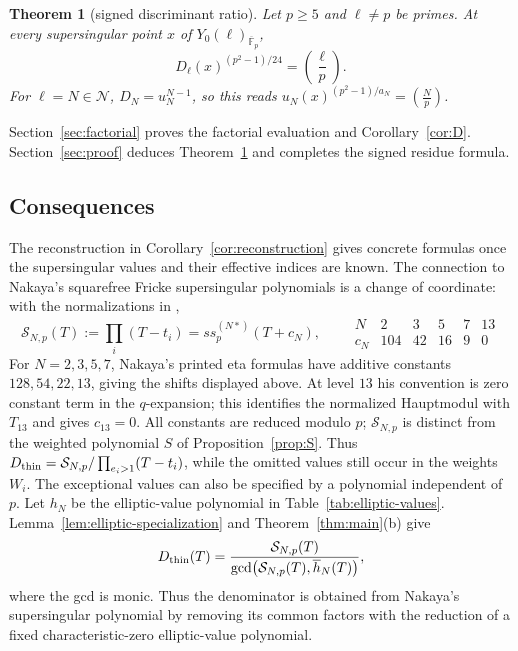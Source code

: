 \documentclass[11pt,a4paper]{article}
\numberwithin{equation}{section}
\newtheorem{theorem}{Theorem}[section]
\theoremstyle{definition}
\theoremstyle{remark}
\newcommand{\Fb}{\overline{\mathbb F}_p}
\newcommand{\leg}[2]{\left(\frac{#1}{#2}\right)}
\newcommand{\Lp}[1]{\left(\frac{#1}{p}\right)}
\begin{document}
\begin{theorem}[signed discriminant ratio]\label{thm:C}
Let $p\ge5$ and $\ell\ne p$ be primes. At every supersingular point
$x$ of $Y_0(\ell)_{\Fb}$,
\[
D_\ell(x)^{(p^2-1)/24}=\leg{\ell}{p}.
\]
For $\ell=N\in\mathcal N$, $D_N=u_N^{N-1}$, so this reads
$u_N(x)^{(p^2-1)/a_N}=\Lp{N}$.
\end{theorem}

Section~\ref{sec:factorial} proves the factorial evaluation and
Corollary~\ref{cor:D}. Section~\ref{sec:proof} deduces
Theorem~\ref{thm:C} and completes the signed residue formula.

\subsection{Consequences}\label{subsec:consequences}
The reconstruction in Corollary~\ref{cor:reconstruction} gives concrete formulas
once the supersingular values and their effective indices are known.
The connection to Nakaya's squarefree Fricke supersingular polynomials is a
change of coordinate: with the normalizations in \citet[\S4]{Nakaya19},
\begin{equation}\label{eq:nakaya-coordinate}
\mathcal S_{N,p}(T):=\prod_i(T-t_i)=ss_p^{(N*)}(T+c_N),\qquad
\begin{array}{c|rrrrr}
N&2&3&5&7&13\\\hline
c_N&104&42&16&9&0
\end{array}
\end{equation}
For $N=2,3,5,7$, Nakaya's printed eta formulas have additive
constants $128,54,22,13$, giving the shifts displayed above. At level
$13$ his convention is zero constant term in the $q$-expansion; this
identifies the normalized Hauptmodul with $T_{13}$ and gives $c_{13}=0$.
All constants are reduced modulo $p$; $\mathcal S_{N,p}$ is distinct from the
weighted polynomial $S$ of Proposition~\ref{prop:S}. Thus
$D_{\rm thin}=\mathcal S_{N,p}/\prod_{e_i>1}(T-t_i)$, while the omitted
values still occur in the weights $W_i$.
The exceptional values can also be specified by a polynomial independent of $p$.
Let $h_N$ be the elliptic-value polynomial in Table~\ref{tab:elliptic-values}.
Lemma~\ref{lem:elliptic-specialization} and Theorem~\ref{thm:main}(b) give
\begin{equation}\label{eq:elliptic-gcd}
D_{\rm thin}(T)=\frac{\mathcal S_{N,p}(T)}
{\gcd\bigl(\mathcal S_{N,p}(T),\overline h_N(T)\bigr)},
\end{equation}
where the gcd is monic. Thus the denominator is obtained from Nakaya's
supersingular polynomial by removing its common factors with the reduction
of a fixed characteristic-zero elliptic-value polynomial.
\end{document}
